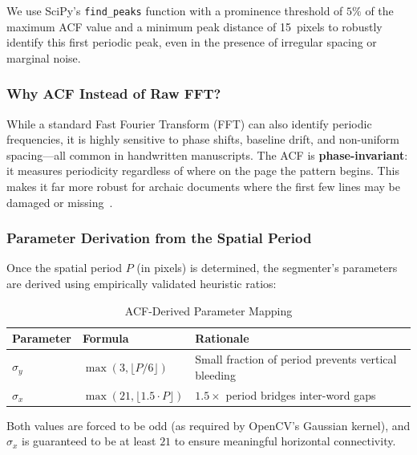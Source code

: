 \documentclass[12pt, a4paper]{article}
\begin{document}
We use SciPy's \texttt{find\_peaks} function with a prominence threshold of $5\%$ of the maximum ACF value and a minimum peak distance of 15~pixels to robustly identify this first periodic peak, even in the presence of irregular spacing or marginal noise.

\subsubsection{Why ACF Instead of Raw FFT?}

While a standard Fast Fourier Transform (FFT) can also identify periodic frequencies, it is highly sensitive to phase shifts, baseline drift, and non-uniform spacing---all common in handwritten manuscripts. The ACF is \textbf{phase-invariant}: it measures periodicity regardless of where on the page the pattern begins. This makes it far more robust for archaic documents where the first few lines may be damaged or missing~\cite{ogorman1993}.

\subsubsection{Parameter Derivation from the Spatial Period}

Once the spatial period $P$ (in pixels) is determined, the segmenter's parameters are derived using empirically validated heuristic ratios:

\begin{table}[H]
\centering
\caption{ACF-Derived Parameter Mapping}
\label{tab:acf_mapping}
\begin{tabular}{@{}lll@{}}
\toprule
\textbf{Parameter} & \textbf{Formula} & \textbf{Rationale} \\
\midrule
$\sigma_y$ & $\max(3, \lfloor P/6 \rfloor)$ & Small fraction of period prevents vertical bleeding \\
$\sigma_x$ & $\max(21, \lfloor 1.5 \cdot P \rfloor)$ & $1.5\times$ period bridges inter-word gaps \\
\bottomrule
\end{tabular}
\end{table}

Both values are forced to be odd (as required by OpenCV's Gaussian kernel), and $\sigma_x$ is guaranteed to be at least $21$ to ensure meaningful horizontal connectivity.
\end{document}
